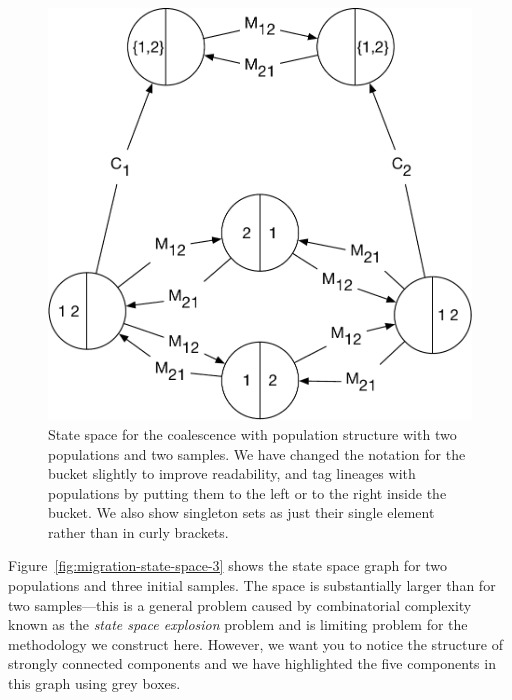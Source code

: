 \documentclass[graybox]{svmult}
\begin{document}
\begin{figure}[h]
\sidecaption
\includegraphics[scale=.30]{figures/migration-coalescence-state-space}
\caption{State space for the coalescence with population structure with two populations and two samples. We have changed the notation for the bucket slightly to improve readability, and tag lineages with populations by putting them to the left or to the right inside the bucket. We also show singleton sets as just their single element rather than in curly brackets.}
\label{fig:migration-coalescence-state-space}
\end{figure}

Figure~\ref{fig:migration-state-space-3} shows the state space graph for two populations and three initial samples. The space is substantially larger than for two samples---this is a general problem caused by combinatorial complexity known as the \emph{state space explosion} problem and is limiting problem for the methodology we construct here. However, we want you to notice the structure of strongly connected components and we have highlighted the five components in this graph using grey boxes.
\end{document}
